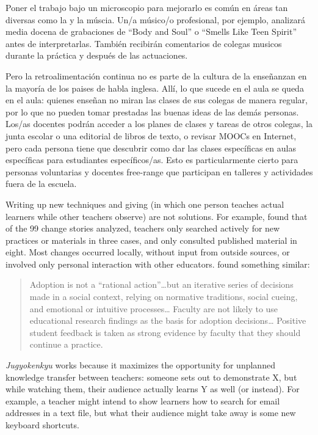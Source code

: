 Poner el trabajo bajo un microscopio para mejorarlo es común
en áreas tan diversas como la  y la múscia.
Un/a músico/o profesional,
por ejemplo,
analizará media docena de grabaciones de ``Body and Soul'' o ``Smells Like Teen Spirit'' antes de interpretarlas.
También recibirán comentarios de colegas musicos durante la práctica y después de las actuaciones.

Pero la retroalimentación continua no es parte de la cultura de la enseñanzan en la mayoría de los paises de habla inglesa.
Allí,
lo que sucede en el aula se queda en el aula:
quienes enseñan no miran las clases de sus colegas de manera regular,
por lo que no pueden tomar prestadas las buenas ideas de las demás personas.
Los/as docentes podrán acceder a los planes de clases y tareas de otros colegas,
la junta escolar o una editorial de libros de texto,
o revisar MOOCs en Internet,
pero cada persona tiene que descubrir
como dar las clases específicas en aulas específicas para estudiantes específicos/as.
Esto es particularmente cierto para personas voluntarias y docentes free-range
que participan en talleres y actividades fuera de la escuela.

Writing up new techniques
and giving 
(in which one person teaches actual learners while other teachers observe)
are not solutions.
For example,
\cite{Finc2007,Finc2012} found that of the 99 change stories analyzed,
teachers only searched actively for new practices or materials in three cases,
and only consulted published material in eight.
Most changes occurred locally,
without input from outside sources,
or involved only personal interaction with other educators.
\cite{Bark2015} found something similar:

\begin{quote}

  Adoption is not a ``rational action''{\ldots}but
  an iterative series of decisions made in a social context,
  relying on normative traditions, social cueing,
  and emotional or intuitive processes{\ldots}
  Faculty are not likely to use educational research findings
  as the basis for adoption decisions{\ldots}
  Positive student feedback is taken as strong evidence by faculty
  that they should continue a practice.

\end{quote}

\emph{Jugyokenkyu} works because it maximizes the opportunity for unplanned knowledge transfer between teachers:
someone sets out to demonstrate X,
but while watching them,
their audience actually learns Y as well (or instead).
For example,
a teacher might intend to show learners how to search for email addresses in a text file,
but what their audience might take away is some new keyboard shortcuts.

